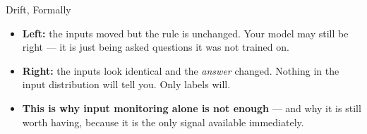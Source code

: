 \begin{frame}{Drift, Formally}
    \vspace{0.18em}
    \begin{itemize}
        \scriptsize
        \item \textbf{Left:} the inputs moved but the rule is unchanged. Your model may still be right ---
              it is just being asked questions it was not trained on.
        \item \textbf{Right:} the inputs look identical and the \emph{answer} changed. Nothing in the input
              distribution will tell you. Only labels will.
        \item \textbf{This is why input monitoring alone is not enough} --- and why it is still worth having,
              because it is the only signal available immediately.
    \end{itemize}

\end{frame}
